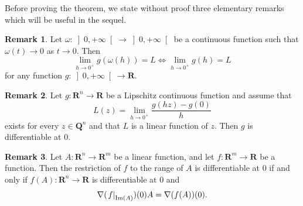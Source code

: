 \documentclass[manuscript, printscheme]{aomart}
\newtheorem[{}\it]{thm}{Theorem}[section]
\theoremstyle{definition}
\newtheorem{rem}{Remark}[section]
\newtheorem*[{}\it]{notation}{Notation}
\DeclareMathOperator{\IM}{Im}
\newcommand{\eval}[2][\right]{\relax
  \ifx#1\right\relax \left.\fi#2#1\rvert}
\begin{document}
Before proving the theorem, we state without proof three elementary
remarks which will be useful in the sequel.
\begin{rem}\label{r:omb}
Let $\omega\colon \left]0,+\infty\right[\to \left]0,+\infty\right[$
be a continuous function such that $\omega (t)\to 0$ as $t\to
0$. Then
\[\lim_{h\to 0^+}g(\omega(h))=L\Leftrightarrow\lim_{h\to
0^+}g(h)=L\]
for any function $g\colon \left]0,+\infty\right[\to \mathbf{R}$.
\end{rem}
\begin{rem}\label{r:dif}
Let $g \colon  \mathbf{R}^n\to \mathbf{R}$ be a Lipschitz
continuous function and assume that
\[L(z)=\lim_{h\to 0^+}\frac{g(hz)-g(0)}h\]
exists for every $z\in\mathbf{Q}^n$ and that $L$ is a linear function of
$z$. Then $g$ is differentiable at 0.
\end{rem}
\begin{rem}\label{r:dif0}
Let $A \colon \mathbf{R}^n\to \mathbf{R}^m$ be a linear function, and
let $f \colon \mathbf{R}^m\to \mathbf{R}$ be a function. Then the
restriction of $f$ to the range of $A$ is differentiable at 0 if and
only if $f(A)\colon \mathbf{R}^n\to \mathbf{R}$ is differentiable at 0
and
\[\nabla(\eval{f}_{\IM(A)})(0)A=\nabla (f(A))(0).\]
\end{rem}
\end{document}
